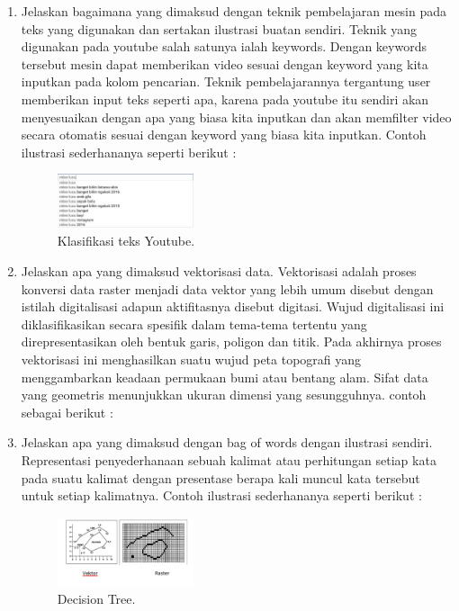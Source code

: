 \begin{enumerate}
	\item Jelaskan bagaimana yang dimaksud dengan teknik pembelajaran mesin pada teks yang digunakan dan sertakan ilustrasi buatan sendiri.
	\hfill\break
	Teknik yang digunakan pada youtube salah satunya ialah keywords. Dengan keywords tersebut mesin dapat memberikan video sesuai dengan keyword yang kita inputkan pada kolom pencarian. Teknik pembelajarannya tergantung user memberikan input teks seperti apa, karena pada youtube itu sendiri akan menyesuaikan dengan apa yang biasa kita inputkan dan akan memfilter video secara otomatis sesuai dengan keyword yang biasa kita inputkan. Contoh ilustrasi sederhananya seperti berikut :

	\begin{figure}[H]
	\centering
		\includegraphics[width=4cm]{figures/1174080/4/3.PNG}
		\caption{Klasifikasi teks Youtube.}
	\end{figure}

	\item Jelaskan apa yang dimaksud vektorisasi data.
	\hfill\break
	Vektorisasi adalah proses konversi data raster menjadi data vektor yang lebih umum disebut dengan istilah digitalisasi adapun aktifitasnya disebut digitasi. Wujud digitalisasi ini diklasifikasikan secara spesifik dalam tema-tema tertentu yang direpresentasikan oleh bentuk garis, poligon dan titik. Pada akhirnya proses vektorisasi ini menghasilkan suatu wujud peta topografi yang menggambarkan keadaan permukaan bumi atau bentang alam. Sifat data yang geometris menunjukkan ukuran dimensi yang sesungguhnya. contoh sebagai berikut :
	\item Jelaskan apa yang dimaksud dengan bag of words dengan ilustrasi sendiri.
	\hfill\break
	Representasi penyederhanaan sebuah kalimat atau perhitungan setiap kata pada suatu kalimat dengan presentase berapa kali muncul kata tersebut untuk setiap kalimatnya. Contoh ilustrasi sederhananya seperti berikut : 

	\begin{figure}[H]
	\centering
		\includegraphics[width=4cm]{figures/1174080/4/4.PNG}
		\caption{Decision Tree.}
	\end{figure}


\end{enumerate}
